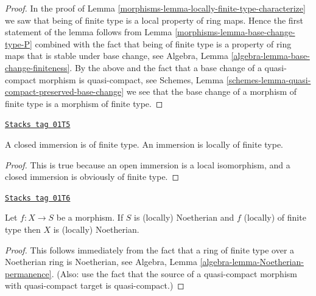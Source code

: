 \begin{proof}

In the proof of Lemma \ref{morphisms-lemma-locally-finite-type-characterize}
we saw that being of finite type is a local property of ring maps.
Hence the first statement of the lemma follows from
Lemma \ref{morphisms-lemma-base-change-type-P} combined
with the fact that being of finite type is a property of ring maps that is
stable under base change, see
Algebra, Lemma \ref{algebra-lemma-base-change-finiteness}.
By the above and the fact that a base change of a
quasi-compact morphism is quasi-compact, see
Schemes, Lemma \ref{schemes-lemma-quasi-compact-preserved-base-change}
we see that the base change of a morphism of finite type is
a morphism of finite type.
\end{proof}

\begin{lemma}
\label{morphisms-lemma-immersion-locally-finite-type}
\href{https://stacks.math.columbia.edu/tag/01T5}{\texttt{Stacks tag 01T5}}

A closed immersion is of finite type.
An immersion is locally of finite type.
\end{lemma}

\begin{proof}
This is true because an open immersion is a local isomorphism,
and a closed immersion is obviously of finite type.
\end{proof}

\begin{lemma}
\label{morphisms-lemma-finite-type-noetherian}
\href{https://stacks.math.columbia.edu/tag/01T6}{\texttt{Stacks tag 01T6}}

Let $f : X \to S$ be a morphism.
If $S$ is (locally) Noetherian and $f$ (locally) of finite type
then $X$ is (locally) Noetherian.
\end{lemma}

\begin{proof}
This follows immediately from the fact that a ring
of finite type over a Noetherian ring is Noetherian,
see Algebra, Lemma \ref{algebra-lemma-Noetherian-permanence}.
(Also: use the fact that the source of a quasi-compact morphism
with quasi-compact target is quasi-compact.)
\end{proof}

